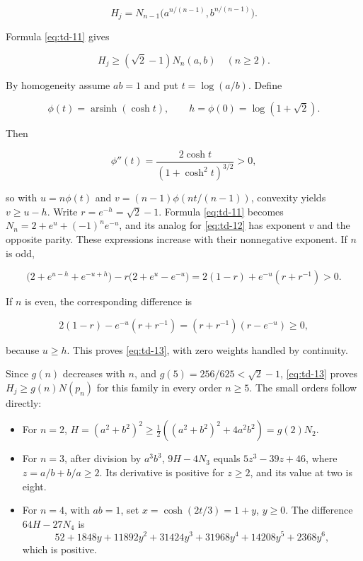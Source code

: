 \documentclass[11pt,a4paper]{article}
\providecommand{\tightlist}{\setlength{\itemsep}{0pt}\setlength{\parskip}{0pt}}
\theoremstyle{definition}
\theoremstyle{remark}
\begin{document}
\begin{equation}\label{eq:td-12}
H_j=N_{n-1}\bigl(a^{n/(n-1)},b^{n/(n-1)}\bigr).
\end{equation}

Formula \eqref{eq:td-11} gives

\begin{equation}\label{eq:td-13}
H_j\ge(\sqrt2-1)N_n(a,b)\quad(n\ge2).
\end{equation}

By homogeneity assume \(ab=1\) and put \(t=\log(a/b)\). Define

\[
\phi(t)=\operatorname{arsinh}(\cosh t),\qquad
h=\phi(0)=\log(1+\sqrt2).
\]

Then

\[
\phi''(t)=\frac{2\cosh t}{(1+\cosh^2t)^{3/2}}>0,
\]

so with \(u=n\phi(t)\) and \(v=(n-1)\phi(nt/(n-1))\), convexity yields
\(v\ge u-h\). Write \(r=e^{-h}=\sqrt2-1\). Formula \eqref{eq:td-11} becomes
\(N_n=2+e^u+(-1)^ne^{-u}\), and its analog for \eqref{eq:td-12} has exponent
\(v\) and the opposite parity. These expressions increase with their
nonnegative exponent. If \(n\) is odd,

\[
\bigl(2+e^{u-h}+e^{-u+h}\bigr)
-r\bigl(2+e^u-e^{-u}\bigr)
=2(1-r)+e^{-u}(r+r^{-1})>0.
\]

If \(n\) is even, the corresponding difference is

\[
2(1-r)-e^{-u}(r+r^{-1})
=(r+r^{-1})(r-e^{-u})\ge0,
\]

because \(u\ge h\). This proves \eqref{eq:td-13}, with zero weights handled by
continuity.

Since \(g(n)\) decreases with \(n\), and \(g(5)=256/625<\sqrt2-1\),
\eqref{eq:td-13} proves \(H_j\ge g(n)N(p_n)\) for this family in every order
\(n\ge5\). The small orders follow directly:

\begin{itemize}
\tightlist
\item
  For \(n=2\),
  \(H=(a^2+b^2)^2\ge\tfrac12((a^2+b^2)^2+4a^2b^2)=g(2)N_2\).
\item
  For \(n=3\), after division by \(a^3b^3\), \(9H-4N_3\) equals
  \(5z^3-39z+46\), where \(z=a/b+b/a\ge2\). Its derivative is positive
  for \(z\ge2\), and its value at two is eight.
\item
  For \(n=4\), with \(ab=1\), set \(x=\cosh(2t/3)=1+y\), \(y\ge0\). The
  difference \(64H-27N_4\) is \[
  52+1848y+11892y^2+31424y^3+31968y^4+14208y^5+2368y^6,
  \] which is positive.
\end{itemize}
\end{document}
